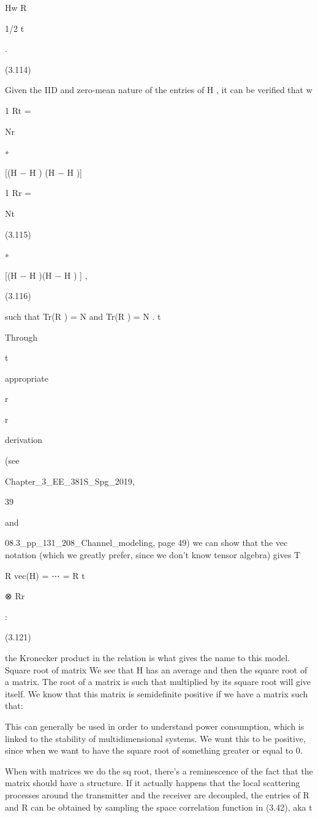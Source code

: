 {{{{Hw R

1/2 t

.

(3.114)

Given the IID and zero-mean nature of the entries of H , it can be verified that w

1 Rt =

Nr

∗

[(H − \mu H ) (H − \mu H )]

1 Rr =

Nt

(3.115)

∗

[(H − \mu H )(H − \mu H ) ] ,

(3.116)

such that Tr(R ) = N and Tr(R ) = N .
t

Through

t

appropriate

r

r

derivation

(see

Chapter_3_EE_381S_Spg_2019,

39

and

08.3_pp_131_208_Channel_modeling, page 49) we can show that the vec notation (which we greatly prefer, since we don't know tensor algebra) gives T

R vec(H) = ⋯ = R t

⊗ Rr

:

(3.121)

the Kronecker product in the relation is what gives the name to this model.
Square root of matrix We see that H has an average and then the square root of a matrix. The root of a matrix is such that multiplied by its square root will give itself.
We know that this matrix is semidefinite positive if we have a matrix such that:

This can generally be used in order to understand power consumption, which is linked to the stability of multidimensional systems.
We want this to be positive, since when we want to have the square root of something greater or equal to 0.

When with matrices we do the sq root, there's a reminescence of the fact that the matrix should have a structure.
If it actually happens that the local scattering processes around the transmitter and the receiver are decoupled, the entries of R and R can be obtained by sampling the space correlation function in (3.42), aka t

}}}}
